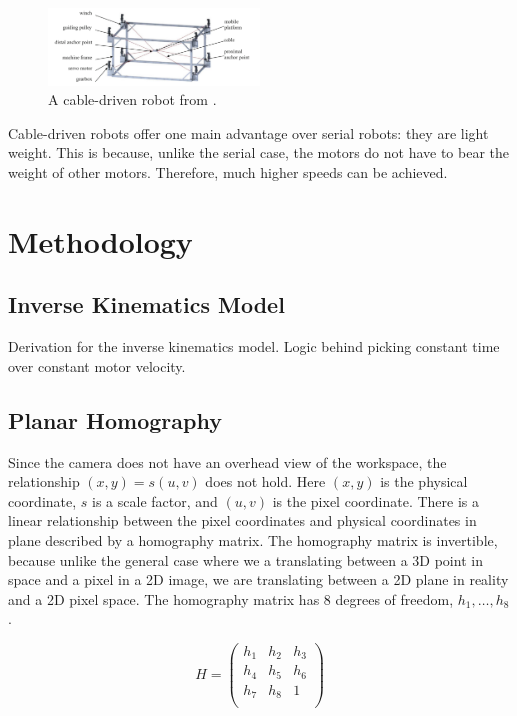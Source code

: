 \documentclass[11pt]{article}
\begin{document}
\begin{figure}[h]
\centering
\includegraphics[width=0.5\textwidth]{Cabledrivenrobot.png}
\caption{A cable-driven robot from \cite{pott2018cable}.}
\label{fig:figure6}
\end{figure}

Cable-driven robots offer one main advantage over serial robots: they are light weight. This is because, unlike the serial case, the
motors do not have to bear the weight of other motors. Therefore, much higher speeds can be achieved. 

\section{Methodology}

\subsection{Inverse Kinematics Model}
Derivation for the inverse kinematics model.
Logic behind picking constant time over constant motor velocity.

\subsection{Planar Homography}

Since the camera does not have an overhead view of the workspace, the relationship $(x, y) = s(u, v)$ does not hold. Here
$(x, y)$ is the physical coordinate, $s$ is a scale factor, and $(u, v)$ is the pixel coordinate. There is a linear
relationship between the pixel coordinates and physical coordinates in plane described by a homography matrix. The homography
matrix is invertible, because unlike the general case where we a translating between a 3D point in space and a pixel in a 2D image,
we are translating between a 2D plane in reality and a 2D pixel space. The homography matrix has 8 degrees of freedom, $h_1, \dots, h_8$.

$$ H =
\begin{pmatrix}
h_1 & h_2 & h_3 \\
h_4 & h_5 & h_6 \\
h_7 & h_8 & 1 \\
\end{pmatrix}
$$
\end{document}
